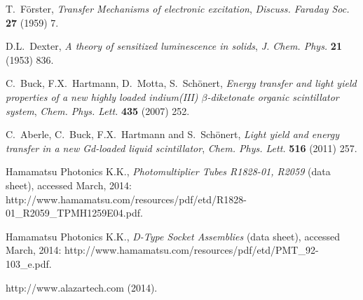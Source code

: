 \documentclass{JINST}
\begin{document}
\begin{thebibliography}{35}
T.~F\"orster, \emph{Transfer Mechanisms of electronic excitation}, \emph{Discuss. Faraday Soc.} {\bf 27} (1959) 7.

D.L.~Dexter, \emph{A theory of sensitized luminescence in solids}, \emph{J. Chem. Phys.} {\bf 21} (1953) 836.

C.~Buck, F.X.~Hartmann, D.~Motta, S.~Sch\"onert, \emph{Energy transfer and light yield properties of a new highly loaded indium(III) $\beta$-diketonate organic scintillator system}, \emph{Chem. Phys. Lett.} {\bf 435} (2007) 252. 

C.~Aberle, C.~Buck, F.X.~Hartmann and S.~Sch\"onert, \emph{Light yield and energy transfer in a new Gd-loaded liquid scintillator}, \emph{Chem. Phys. Lett.} {\bf 516} (2011) 257.  


Hamamatsu Photonics K.K., \emph{Photomultiplier Tubes R1828-01, R2059} (data sheet), accessed March, 2014: http://www.hamamatsu.com/resources/pdf/etd/R1828-01\_R2059\_TPMH1259E04.pdf.

Hamamatsu Photonics K.K., \emph{D-Type Socket Assemblies} (data sheet), accessed March, 2014: http://www.hamamatsu.com/resources/pdf/etd/PMT\_92-103\_e.pdf.

http://www.alazartech.com (2014).

\end{thebibliography}
\end{document}
